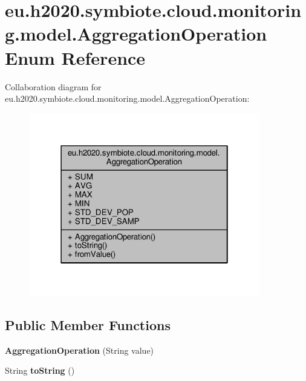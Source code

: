 \hypertarget{enumeu_1_1h2020_1_1symbiote_1_1cloud_1_1monitoring_1_1model_1_1AggregationOperation}{}\section{eu.\+h2020.\+symbiote.\+cloud.\+monitoring.\+model.\+Aggregation\+Operation Enum Reference}
\label{enumeu_1_1h2020_1_1symbiote_1_1cloud_1_1monitoring_1_1model_1_1AggregationOperation}


Collaboration diagram for eu.\+h2020.\+symbiote.\+cloud.\+monitoring.\+model.\+Aggregation\+Operation\+:\nopagebreak
\begin{figure}[H]
\begin{center}
\leavevmode
\includegraphics[width=286pt]{enumeu_1_1h2020_1_1symbiote_1_1cloud_1_1monitoring_1_1model_1_1AggregationOperation__coll__graph}
\end{center}
\end{figure}
\subsection*{Public Member Functions}
\begin{DoxyCompactItemize}
\item 
\mbox{\label{enumeu_1_1h2020_1_1symbiote_1_1cloud_1_1monitoring_1_1model_1_1AggregationOperation_a41e2560efe4e1114911b0be0d5ba87e1}} 
{\bfseries Aggregation\+Operation} (String value)
\item 
\mbox{\label{enumeu_1_1h2020_1_1symbiote_1_1cloud_1_1monitoring_1_1model_1_1AggregationOperation_aedb2b62c8d657a0658ed8d8404a495ba}} 
String {\bfseries to\+String} ()
\end{DoxyCompactItemize}

